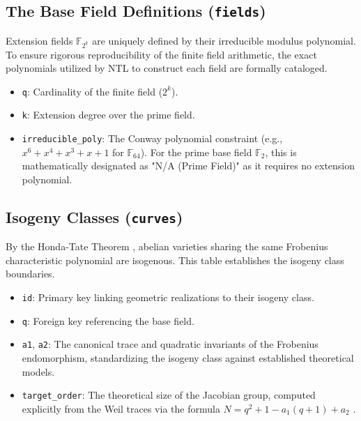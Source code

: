 \documentclass[11pt,letterpaper]{article}
\begin{document}
\subsection{The Base Field Definitions (\texttt{fields})}
Extension fields $\mathbb{F}_{2^k}$ are uniquely defined by their irreducible modulus polynomial. To ensure rigorous reproducibility of the finite field arithmetic, the exact polynomials utilized by NTL to construct each field are formally cataloged.
\begin{itemize}
\item \texttt{q}: Cardinality of the finite field ($2^k$).
\item \texttt{k}: Extension degree over the prime field.
\item \texttt{irreducible\_poly}: The Conway polynomial constraint (e.g., $x^6 + x^4 + x^3 + x + 1$ for $\mathbb{F}_{64}$). For the prime base field $\mathbb{F}_2$, this is mathematically designated as "N/A (Prime Field)" as it requires no extension polynomial.
\end{itemize}

\subsection{Isogeny Classes (\texttt{curves})}
By the Honda-Tate Theorem \cite{Honda1968}, abelian varieties sharing the same Frobenius characteristic polynomial are isogenous. This table establishes the isogeny class boundaries.
\begin{itemize}
\item \texttt{id}: Primary key linking geometric realizations to their isogeny class.
\item \texttt{q}: Foreign key referencing the base field.
\item \texttt{a1}, \texttt{a2}: The canonical trace and quadratic invariants of the Frobenius endomorphism, standardizing the isogeny class against established theoretical models.
\item \texttt{target\_order}: The theoretical size of the Jacobian group, computed explicitly from the Weil traces via the formula $N = q^2 + 1 - a_1(q + 1) + a_2$ \cite{Waterhouse1969}.
\end{itemize}
\end{document}
